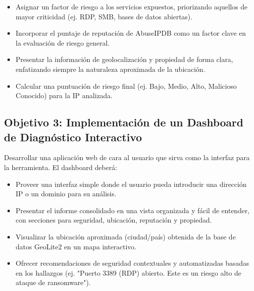 \begin{itemize}
    \item Asignar un factor de riesgo a los servicios expuestos, priorizando aquellos de mayor criticidad (ej. RDP, SMB, bases de datos abiertas).
    \item Incorporar el puntaje de reputación de AbuseIPDB como un factor clave en la evaluación de riesgo general.
    \item Presentar la información de geolocalización y propiedad de forma clara, enfatizando siempre la naturaleza aproximada de la ubicación.
    \item Calcular una puntuación de riesgo final (ej. Bajo, Medio, Alto, Malicioso Conocido) para la IP analizada.
\end{itemize}

\subsection{Objetivo 3: Implementación de un Dashboard de Diagnóstico Interactivo}
Desarrollar una aplicación web de cara al usuario que sirva como la interfaz para la herramienta. El dashboard deberá:

\begin{itemize}
    \item Proveer una interfaz simple donde el usuario pueda introducir una dirección IP o un dominio para su análisis.
    \item Presentar el informe consolidado en una vista organizada y fácil de entender, con secciones para seguridad, ubicación, reputación y propiedad.
    \item Visualizar la ubicación aproximada (ciudad/país) obtenida de la base de datos GeoLite2 en un mapa interactivo.
    \item Ofrecer recomendaciones de seguridad contextuales y automatizadas basadas en los hallazgos (ej. "Puerto 3389 (RDP) abierto. Este es un riesgo alto de ataque de ransomware").
\end{itemize}
